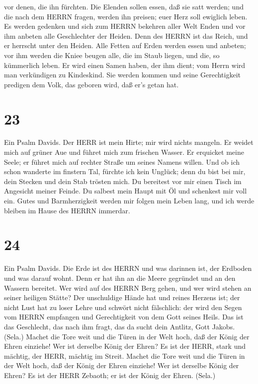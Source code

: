 vor denen, die ihn fürchten.  Die Elenden sollen essen, daß
sie satt werden; und die nach dem HERRN fragen, werden ihn preisen; euer
Herz soll ewiglich leben.  Es werden gedenken und sich zum
HERRN bekehren aller Welt Enden und vor ihm anbeten alle Geschlechter
der Heiden.  Denn des HERRN ist das Reich, und er herrscht
unter den Heiden.  Alle Fetten auf Erden werden essen und
anbeten; vor ihm werden die Kniee beugen alle, die im Staub liegen, und
die, so kümmerlich leben.  Er wird einen Samen haben, der
ihm dient; vom Herrn wird man verkündigen zu Kindeskind. 
Sie werden kommen und seine Gerechtigkeit predigen dem Volk, das geboren
wird, daß er's getan hat.

\hypertarget{section-22}{%
\section{23}\label{section-22}}

 Ein Psalm Davids. Der HERR ist mein Hirte; mir wird nichts
mangeln.  Er weidet mich auf grüner Aue und führet mich zum
frischen Wasser.  Er erquicket meine Seele; er führet mich
auf rechter Straße um seines Namens willen.  Und ob ich
schon wanderte im finstern Tal, fürchte ich kein Unglück; denn du bist
bei mir, dein Stecken und dein Stab trösten mich.  Du
bereitest vor mir einen Tisch im Angesicht meiner Feinde. Du salbest
mein Haupt mit Öl und schenkest mir voll ein.  Gutes und
Barmherzigkeit werden mir folgen mein Leben lang, und ich werde bleiben
im Hause des HERRN immerdar.

\hypertarget{section-23}{%
\section{24}\label{section-23}}

 Ein Psalm Davids. Die Erde ist des HERRN und was darinnen
ist, der Erdboden und was darauf wohnt.  Denn er hat ihn an
die Meere gegründet und an den Wassern bereitet.  Wer wird
auf des HERRN Berg gehen, und wer wird stehen an seiner heiligen Stätte?
 Der unschuldige Hände hat und reines Herzens ist; der nicht
Lust hat zu loser Lehre und schwört nicht fälschlich:  der
wird den Segen vom HERRN empfangen und Gerechtigkeit von dem Gott seines
Heils.  Das ist das Geschlecht, das nach ihm fragt, das da
sucht dein Antlitz, Gott Jakobs. (Sela.)  Machet die Tore
weit und die Türen in der Welt hoch, daß der König der Ehren einziehe!
 Wer ist derselbe König der Ehren? Es ist der HERR, stark
und mächtig, der HERR, mächtig im Streit.  Machet die Tore
weit und die Türen in der Welt hoch, daß der König der Ehren einziehe!
 Wer ist derselbe König der Ehren? Es ist der HERR Zebaoth;
er ist der König der Ehren. (Sela.)

